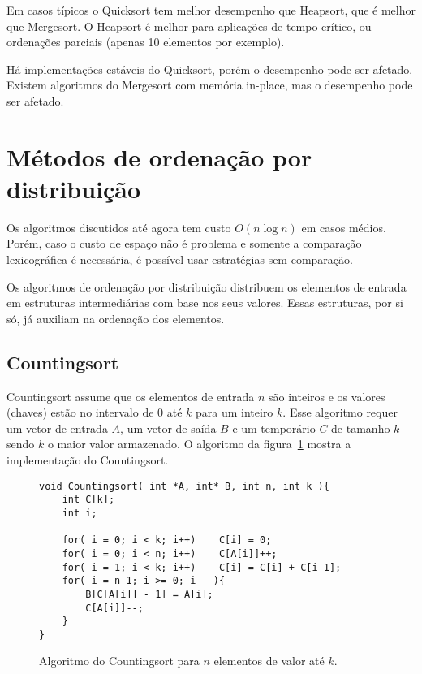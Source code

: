Em casos típicos o Quicksort tem melhor desempenho que Heapsort,
que é melhor que Mergesort.
O Heapsort é melhor para aplicações de tempo crítico, ou ordenações parciais
(apenas 10 elementos por exemplo).

Há implementações estáveis
do Quicksort, porém o desempenho pode ser afetado.  Existem algoritmos do
Mergesort com memória in-place, mas o desempenho pode ser afetado.

\section{Métodos de ordenação por distribuição}

Os algoritmos discutidos até agora tem custo $O(n \log n)$ em casos
médios.
Porém, caso o custo de espaço não é problema e somente a comparação
lexicográfica é necessária, é possível usar estratégias sem comparação.

Os algoritmos de ordenação por distribuição distribuem os elementos de entrada
em estruturas intermediárias com base nos seus valores.
Essas estruturas, por si só, já auxiliam na ordenação dos elementos.

\subsection{Countingsort}

Countingsort assume que os elementos de entrada $n$ são inteiros e
os valores (chaves) estão no intervalo de $0$ até $k$ para um inteiro $k$.
Esse algoritmo requer um vetor de entrada $A$, um vetor de saída $B$ e um
temporário $C$ de tamanho $k$ sendo $k$ o maior valor armazenado.
O algoritmo da figura~\ref{aula03:algo:counting} mostra a implementação do
Countingsort.
%
\begin{figure}[!htb]
\centering
\begin{framed}
\begin{lstlisting}
void Countingsort( int *A, int* B, int n, int k ){
	int C[k];
	int i;

	for( i = 0; i < k; i++)    C[i] = 0;
	for( i = 0; i < n; i++)    C[A[i]]++;
	for( i = 1; i < k; i++)    C[i] = C[i] + C[i-1];
	for( i = n-1; i >= 0; i-- ){
		B[C[A[i]] - 1] = A[i];
		C[A[i]]--;
	}
}
\end{lstlisting}
\end{framed}
\caption{Algoritmo do Countingsort para $n$ elementos de valor até $k$.}
\label{aula03:algo:counting}
\end{figure}

